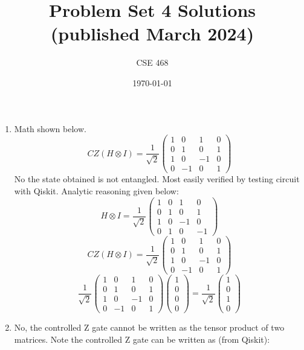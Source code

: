 \documentclass[12pt]{article}
\title{Problem Set 4 Solutions\\(published March 2024)}
\author{CSE 468}
\date{\today}
\begin{document}
\maketitle

\begin{enumerate}[font=\bfseries]
    \item Math shown below.
    \[CZ(H \otimes I) = \frac{1}{\sqrt{2}}
    \begin{pmatrix}
    1 & 0 & 1 & 0 \\
    0 & 1 & 0 & 1 \\
    1 & 0 & -1 & 0 \\
    0 & -1 & 0 & 1
    \end{pmatrix}
    \]
    No the state obtained is not entangled. Most easily verified by testing circuit with Qiskit. Analytic reasoning given below:
    \[H \otimes I = \frac{1}{\sqrt{2}}\begin{pmatrix}
    1 & 0 & 1 & 0 \\
    0 & 1 & 0 & 1 \\
    1 & 0 & -1 & 0 \\
    0 & 1 & 0 & -1
    \end{pmatrix}\]
    \[CZ(H \otimes I) = \frac{1}{\sqrt{2}}
    \begin{pmatrix}
    1 & 0 & 1 & 0 \\
    0 & 1 & 0 & 1 \\
    1 & 0 & -1 & 0 \\
    0 & -1 & 0 & 1
    \end{pmatrix}
    \]
    \[\frac{1}{\sqrt{2}}
    \begin{pmatrix}
    1 & 0 & 1 & 0 \\
    0 & 1 & 0 & 1 \\
    1 & 0 & -1 & 0 \\
    0 & -1 & 0 & 1
    \end{pmatrix}
    \begin{pmatrix}
    1 \\ 0 \\ 0 \\ 0
    \end{pmatrix}
    =
    \frac{1}{\sqrt{2}}
    \begin{pmatrix}
    1 \\ 0 \\ 1 \\ 0
    \end{pmatrix}
    \]
    \item No, the controlled Z gate cannot be written as the tensor product of two matrices. Note the controlled Z gate can be written as (from Qiskit):

\end{enumerate}
\end{document}
